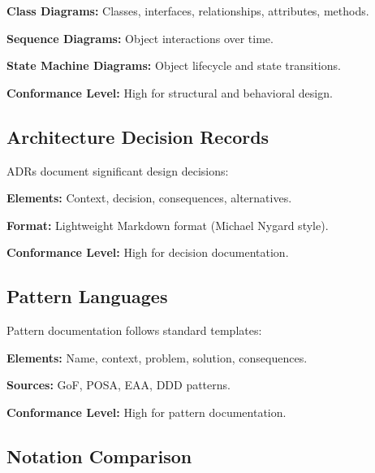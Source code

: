 \documentclass[11pt,letterpaper]{article}
\begin{document}
\textbf{Class Diagrams:} Classes, interfaces, relationships, attributes, methods.

\textbf{Sequence Diagrams:} Object interactions over time.

\textbf{State Machine Diagrams:} Object lifecycle and state transitions.

\textbf{Conformance Level:} High for structural and behavioral design.

\subsection{Architecture Decision Records}

ADRs document significant design decisions:

\textbf{Elements:} Context, decision, consequences, alternatives.

\textbf{Format:} Lightweight Markdown format (Michael Nygard style).

\textbf{Conformance Level:} High for decision documentation.

\subsection{Pattern Languages}

Pattern documentation follows standard templates:

\textbf{Elements:} Name, context, problem, solution, consequences.

\textbf{Sources:} GoF, POSA, EAA, DDD patterns.

\textbf{Conformance Level:} High for pattern documentation.

\subsection{Notation Comparison}
\end{document}
